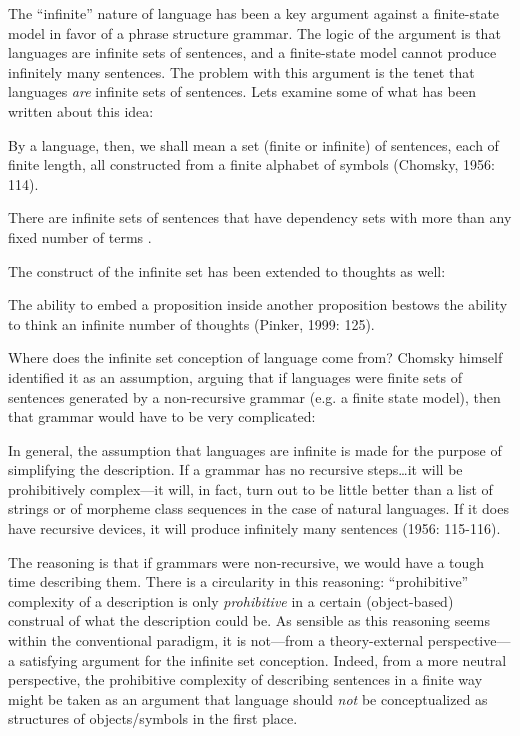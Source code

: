 The “infinite” nature of language has been a key argument against a finite-state model in favor of a phrase structure grammar. The logic of the argument is that languages are infinite sets of sentences, and a finite-state model cannot produce infinitely many sentences. The problem with this argument is the tenet that languages \textit{are} infinite sets of sentences. Lets examine some of what has been written about this idea:  

By a language, then, we shall mean a set (finite or infinite) of sentences, each of finite length, all constructed from a finite alphabet of symbols (Chomsky, 1956: 114).

There are infinite sets of sentences that have dependency sets with more than any fixed number of terms \citep[115]{Chomsky1956}. 

The construct of the infinite set has been extended to thoughts as well:

The ability to embed a proposition inside another proposition bestows the ability to think an infinite number of thoughts (Pinker, 1999: 125). 

  Where does the infinite set conception of language come from? Chomsky himself identified it as an assumption, arguing that if languages were finite sets of sentences generated by a non-recursive grammar (e.g. a finite state model), then that grammar would have to be very complicated:

In general, the assumption that languages are infinite is made for the purpose of simplifying the description. If a grammar has no recursive steps…it will be prohibitively complex—it will, in fact, turn out to be little better than a list of strings or of morpheme class sequences in the case of natural languages. If it does have recursive devices, it will produce infinitely many sentences (1956: 115-116).

  The reasoning is that if grammars were non-recursive, we would have a tough time describing them. There is a circularity in this reasoning: “prohibitive” complexity of a description is only \textit{prohibitive} in a certain (object-based) construal of what the description could be. As sensible as this reasoning seems within the conventional paradigm, it is not—from a theory-external perspective—a satisfying argument for the infinite set conception. Indeed, from a more neutral perspective, the prohibitive complexity of describing sentences in a finite way might be taken as an argument that language should \textit{not} be conceptualized as structures of objects/symbols in the first place.

